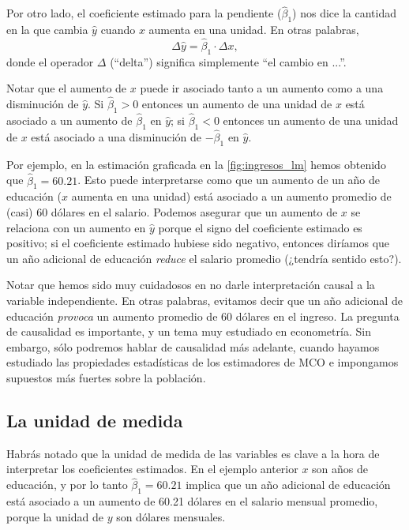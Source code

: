 \documentclass[12pt]{report}\usepackage[]{graphicx}\usepackage[]{color}
\begin{document}
Por otro lado, el coeficiente estimado para la pendiente ($\hat\beta_1$) nos dice la cantidad en la que cambia $\hat y$ cuando $x$ aumenta en una unidad. En otras palabras,
\begin{equation}
\Delta \hat y = \hat \beta_1 \cdot \Delta x,
\end{equation}
donde el operador $\Delta$ (``delta'') significa simplemente ``el cambio en ...''.

Notar que el aumento de $x$ puede ir asociado tanto a un aumento como a una disminución de $\hat y$.
Si $\hat\beta_1 > 0$ entonces un aumento de una unidad de $x$ está asociado a un aumento de $\hat\beta_1$ en $\hat y$; si $\hat\beta_1 < 0$ entonces un aumento de una unidad de $x$ está asociado a una disminución de $-\hat\beta_1$ en $\hat y$.

Por ejemplo, en la estimación graficada en la \autoref{fig:ingresos_lm} hemos obtenido que $\hat\beta_1 = 60.21$.
Esto puede interpretarse como que un aumento de un año de educación ($x$ aumenta en una unidad) está asociado a un aumento promedio de (casi) 60 dólares en el salario.
Podemos asegurar que un aumento de $x$ se relaciona con un aumento en $\hat y$ porque el signo del coeficiente estimado es positivo; si el coeficiente estimado hubiese sido negativo, entonces diríamos que un año adicional de educación \emph{reduce} el salario promedio (¿tendría sentido esto?).

Notar que hemos sido muy cuidadosos en no darle interpretación causal a la variable independiente. En otras palabras, evitamos decir que un año adicional de educación \emph{provoca} un aumento promedio de 60 dólares en el ingreso. La pregunta de causalidad es importante, y un tema muy estudiado en econometría. Sin embargo, sólo podremos hablar de causalidad más adelante, cuando hayamos estudiado las propiedades estadísticas de los estimadores de MCO e impongamos supuestos más fuertes sobre la población.

\subsection{La unidad de medida}

Habrás notado que la unidad de medida de las variables es clave a la hora de interpretar los coeficientes estimados. En el ejemplo anterior $x$ son años de educación, y por lo tanto $\hat\beta_1 = 60.21$ implica que un año adicional de educación está asociado a un aumento de 60.21 dólares en el salario mensual promedio, porque la unidad de $y$ son dólares mensuales.
\end{document}
